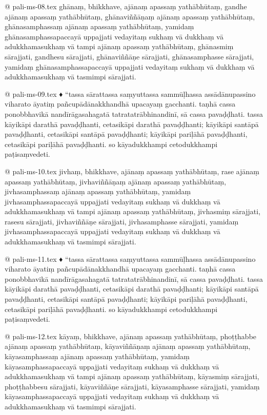 @ pali-ms-08.tex
ghānaṃ, bhikkhave, ajānaṃ apassaṃ yathābhūtaṃ, gandhe ajānaṃ apassaṃ yathābhūtaṃ, ghānaviññāṇaṃ ajānaṃ apassaṃ yathābhūtaṃ, ghānasamphassaṃ ajānaṃ apassaṃ yathābhūtaṃ, yamidaṃ ghānasamphassapaccayā uppajjati vedayitaṃ sukhaṃ vā dukkhaṃ vā adukkhamasukhaṃ vā tampi ajānaṃ apassaṃ yathābhūtaṃ, ghānasmiṃ sārajjati, gandhesu sārajjati, ghānaviññāṇe sārajjati, ghānasamphasse sārajjati, yamidaṃ ghānasamphassapaccayā uppajjati vedayitaṃ sukhaṃ vā dukkhaṃ vā adukkhamasukhaṃ vā tasmimpi sārajjati.

@ pali-ms-09.tex
♦ “tassa sārattassa saṃyuttassa sammūḷhassa assādānupassino viharato āyatiṃ pañcupādānakkhandhā upacayaṃ gacchanti. taṇhā cassa ponobbhavikā nandīrāgasahagatā tatratatrābhinandinī, sā cassa pavaḍḍhati. tassa kāyikāpi darathā pavaḍḍhanti, cetasikāpi darathā pavaḍḍhanti; kāyikāpi santāpā pavaḍḍhanti, cetasikāpi santāpā pavaḍḍhanti; kāyikāpi pariḷāhā pavaḍḍhanti, cetasikāpi pariḷāhā pavaḍḍhanti. so kāyadukkhampi cetodukkhampi paṭisaṃvedeti.

@ pali-ms-10.tex
jivhaṃ, bhikkhave, ajānaṃ apassaṃ yathābhūtaṃ, rase ajānaṃ apassaṃ yathābhūtaṃ, jivhaviññāṇaṃ ajānaṃ apassaṃ yathābhūtaṃ, jivhasamphassaṃ ajānaṃ apassaṃ yathābhūtaṃ, yamidaṃ jivhasamphassapaccayā uppajjati vedayitaṃ sukhaṃ vā dukkhaṃ vā adukkhamasukhaṃ vā tampi ajānaṃ apassaṃ yathābhūtaṃ, jivhasmiṃ sārajjati, rasesu sārajjati, jivhaviññāṇe sārajjati, jivhasamphasse sārajjati, yamidaṃ jivhasamphassapaccayā uppajjati vedayitaṃ sukhaṃ vā dukkhaṃ vā adukkhamasukhaṃ vā tasmimpi sārajjati.

@ pali-ms-11.tex
♦ “tassa sārattassa saṃyuttassa sammūḷhassa assādānupassino viharato āyatiṃ pañcupādānakkhandhā upacayaṃ gacchanti. taṇhā cassa ponobbhavikā nandīrāgasahagatā tatratatrābhinandinī, sā cassa pavaḍḍhati. tassa kāyikāpi darathā pavaḍḍhanti, cetasikāpi darathā pavaḍḍhanti; kāyikāpi santāpā pavaḍḍhanti, cetasikāpi santāpā pavaḍḍhanti; kāyikāpi pariḷāhā pavaḍḍhanti, cetasikāpi pariḷāhā pavaḍḍhanti. so kāyadukkhampi cetodukkhampi paṭisaṃvedeti.

@ pali-ms-12.tex
kāyaṃ, bhikkhave, ajānaṃ apassaṃ yathābhūtaṃ, phoṭṭhabbe ajānaṃ apassaṃ yathābhūtaṃ, kāyaviññāṇaṃ ajānaṃ apassaṃ yathābhūtaṃ, kāyasamphassaṃ ajānaṃ apassaṃ yathābhūtaṃ, yamidaṃ kāyasamphassapaccayā uppajjati vedayitaṃ sukhaṃ vā dukkhaṃ vā adukkhamasukhaṃ vā tampi ajānaṃ apassaṃ yathābhūtaṃ, kāyasmiṃ sārajjati, phoṭṭhabbesu sārajjati, kāyaviññāṇe sārajjati, kāyasamphasse sārajjati, yamidaṃ kāyasamphassapaccayā uppajjati vedayitaṃ sukhaṃ vā dukkhaṃ vā adukkhamasukhaṃ vā tasmimpi sārajjati.

